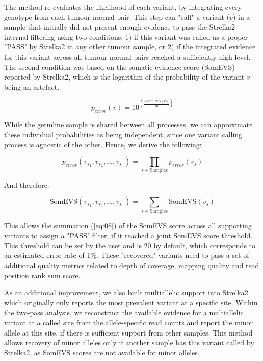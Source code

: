 The method re-evaluates the likelihood of each variant, by integrating every genotype from each tumour-normal pair. This step can "call" a variant ($v$) in a sample that initially did not present enough evidence to pass the Strelka2 internal filtering using two conditions: 1) if this variant was called as a proper "PASS" by Strelka2 in any other tumour sample, or 2) if the integrated evidence for this variant across all tumour-normal pairs reached a sufficiently high level. The second condition was based on the somatic evidence score (SomEVS) reported by Strelka2, which is the logarithm of the probability of the variant $v$ being an artefact.

\begin{equation}
p_{error}(v) = 10^{\left( \frac{-\text{SomEVS}(v)}{10} \right)} \label{eq:06}
\end{equation}

While the germline sample is shared between all processes, we can approximate these individual probabilities as being independent, since one variant calling process is agnostic of the other. Hence, we derive the following:

\begin{equation}
p_{error}(v_{s_1},v_{s_2},\ldots,v_{s_n}) = \prod_{s \in \text{Samples}} p_{error}(v_{s}) \label{eq:07}
\end{equation}

And therefore:

\begin{equation}
\text{SomEVS}(v_{s_1},v_{s_2},\ldots,v_{s_n}) = \sum_{s \in \text{Samples}} \text{SomEVS}(v_{s}) \label{eq:08}
\end{equation}

This allows the summation (\autoref{eq:08}) of the SomEVS score across all supporting variants to assign a "PASS" filter, if it reached a joint SomEVS score threshold. This threshold can be set by the user and is 20 by default, which corresponds to an estimated error rate of 1\%. These "recovered" variants need to pass a set of additional quality metrics related to depth of coverage, mapping quality and read position rank sum score.

As an additional improvement, we also built multiallelic support into Strelka2 which originally only reports the most prevalent variant at a specific site. Within the two-pass analysis, we reconstruct the available evidence for a multiallelic variant at a called site from the allele-specific read counts and report the minor allele at this site, if there is sufficient support from other samples. This method allows recovery of minor alleles only if another sample has this variant called by Strelka2, as SomEVS scores are not available for minor alleles.



